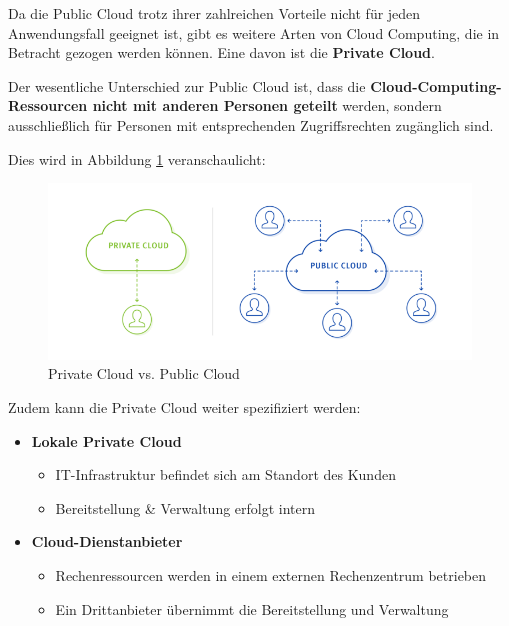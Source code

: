         Da die Public Cloud trotz ihrer zahlreichen Vorteile nicht für jeden Anwendungsfall geeignet ist, gibt es weitere Arten von Cloud Computing, die in Betracht gezogen werden können. Eine davon ist die \textbf{Private Cloud}. 
    
        Der wesentliche Unterschied zur Public Cloud ist, dass die \textbf{Cloud-Computing-Ressourcen nicht mit anderen Personen geteilt} werden, sondern ausschließlich für Personen mit entsprechenden Zugriffsrechten zugänglich sind.
        
        Dies wird in Abbildung \ref{fig:private-cloud-vs-public-cloud} veranschaulicht:
        \begin{figure}[H]
            \centering
            \includegraphics[width=0.85\linewidth]{images/EA/private-cloud-vs-public-cloud.png}
            \caption{Private Cloud vs. Public Cloud \\ \cite{EA:Img01}}
            \label{fig:private-cloud-vs-public-cloud}
        \end{figure}
    
        Zudem kann die Private Cloud weiter spezifiziert werden:
        \begin{itemize}
            \item \textbf{Lokale Private Cloud}
            \begin{itemize}[label=$\circ$]
                \item IT-Infrastruktur befindet sich am Standort des Kunden
                \item Bereitstellung \& Verwaltung erfolgt intern
            \end{itemize}
            \item \textbf{Cloud-Dienstanbieter}
            \begin{itemize}[label=$\circ$]
                \item Rechenressourcen werden in einem externen Rechenzentrum betrieben
                \item Ein Drittanbieter übernimmt die Bereitstellung und Verwaltung
            \end{itemize}
        \end{itemize}
    
